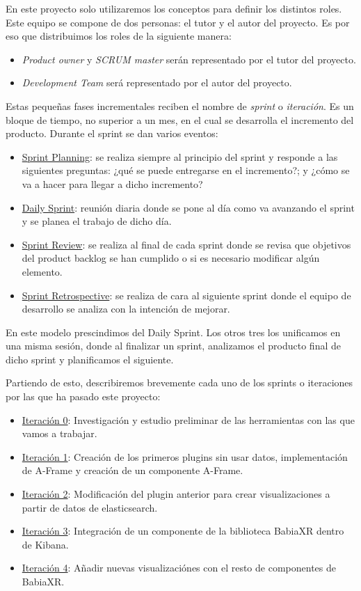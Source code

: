 \documentclass[a4paper, 12pt]{book}
\begin{document}
En este proyecto solo utilizaremos los conceptos para definir los distintos roles. Este equipo se compone de dos personas: el tutor y el autor del proyecto. Es por eso que distribuimos los roles de la siguiente manera:

\begin{itemize}
    \item \textit{Product owner} y \textit{SCRUM master} serán representado por el tutor del proyecto.
    \item \textit{Development Team} será representado por el autor del proyecto.
\end{itemize}

Estas pequeñas fases incrementales reciben el nombre de \textit{sprint} o \textit{iteración}. Es un bloque de tiempo, no superior a un mes, en el cual se desarrolla el incremento del producto. Durante el sprint se dan varios eventos:

\begin{itemize}
    \item \underline{Sprint Planning}: se realiza siempre al principio del sprint y responde a las siguientes preguntas: ¿qué se puede entregarse en el incremento?; y ¿cómo se va a hacer para llegar a dicho incremento?
    \item \underline{Daily Sprint}: reunión diaria donde se pone al día como va avanzando el sprint y se planea el trabajo de dicho día.
    \item \underline{Sprint Review}: se realiza al final de cada sprint donde se revisa que objetivos del product backlog se han cumplido o si es necesario modificar algún elemento.
    \item \underline{Sprint Retrospective}: se realiza de cara al siguiente sprint donde el equipo de desarrollo se analiza con la intención de mejorar.
\end{itemize}

En este modelo prescindimos del Daily Sprint. Los otros tres los unificamos en una misma sesión, donde al finalizar un sprint, analizamos el producto final de dicho sprint y planificamos el siguiente. 


Partiendo de esto, describiremos brevemente cada uno de los sprints o iteraciones por las que ha pasado este proyecto:

\begin{itemize}
    \item \underline{Iteración 0}: Investigación y estudio preliminar de las herramientas con las que vamos a trabajar.
    \item \underline{Iteración 1}: Creación de los primeros plugins sin usar datos, implementación de A-Frame y creación de un componente A-Frame.
    \item \underline{Iteración 2}: Modificación del plugin anterior para crear visualizaciones a partir de datos de elasticsearch.
    \item \underline{Iteración 3}: Integración de un componente de la biblioteca BabiaXR dentro de Kibana.
    \item \underline{Iteración 4}: Añadir nuevas visualizaciónes con el resto de componentes de BabiaXR.
\end{itemize}
\end{document}
